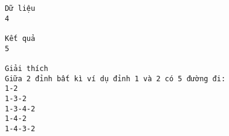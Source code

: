 \begin{verbatim}
Dữ liệu
4

Kết quả
5

Giải thích
Giữa 2 đỉnh bất kì ví dụ đỉnh 1 và 2 có 5 đường đi:
1-2
1-3-2
1-3-4-2
1-4-2
1-4-3-2
\end{verbatim}